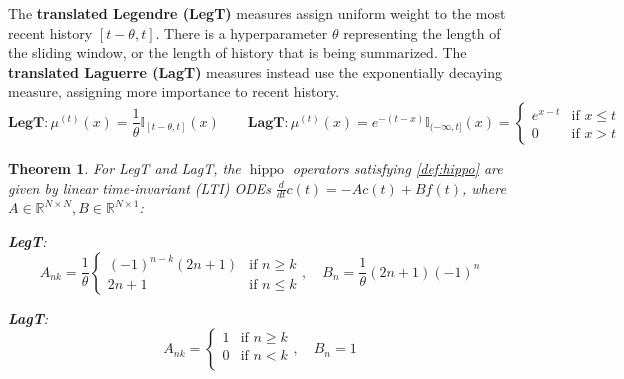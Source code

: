 \documentclass{article}
\newtheorem{theorem}{Theorem}
\newcommand{\R}{\mathbb{R}}
\newcommand{\ddt}{\frac{d}{d t}}
\DeclareMathOperator{\hippo}{hippo}
\begin{document}
The \textbf{translated Legendre (LegT)} measures assign uniform weight to the most recent history $[t-\theta, t]$.
There is a hyperparameter $\theta$ representing the length of the sliding window,
or the length of history that is being summarized.
The \textbf{translated Laguerre (LagT)} measures instead use the exponentially decaying measure, assigning more importance to recent history.
\begin{equation*}
    \textbf{LegT}: \mu^{(t)}(x) = \frac{1}{\theta} \mathbb{I}_{[t-\theta, t]}(x)
    \qquad
    \textbf{LagT}: \mu^{(t)}(x)
    = e^{-(t-x)} \mathbb{I}_{(-\infty, t]}(x)
    =
    \begin{cases}
      e^{x-t} & \mbox{if } x \le t \\
      0 & \mbox{if } x > t
    \end{cases}
\end{equation*}





\begin{theorem}
  \label{thm:legt-lagt}
  For LegT and LagT, the $\hippo$ operators satisfying \cref{def:hippo} are given by linear time-invariant (LTI) ODEs $\ddt c(t) = - A c(t) + B f(t)$, where $A \in \R^{N \times N}, B \in \R^{N \times 1}$:

  \small
  \begin{minipage}{.60\linewidth}
    \textnormal{\textbf{LegT}:}
    \vspace{-1em}
    \begin{equation}
      \label{eq:translated-legendre-dynamics}
      A_{nk} =
      \frac{1}{\theta}
      \begin{cases}
        (-1)^{n-k} (2n+1) & \mbox{if } n \ge k \\
        2n+1 & \mbox{if } n \le k
      \end{cases},
      \quad
      B_n = \frac{1}{\theta} (2n+1) (-1)^n
    \end{equation}
  \end{minipage}\hfill \begin{minipage}{.35\linewidth}
    \textnormal{\textbf{LagT}:}
    \vspace{-1em}
    \begin{equation}
      \label{eq:laguerre-dynamics}
      A_{nk} =
      \begin{cases}1 & \mbox{if } n \ge k \\
        0 & \mbox{if } n < k \\
      \end{cases},
      \quad
      B_n = 1
    \end{equation}
  \end{minipage}

\end{theorem}
\end{document}
